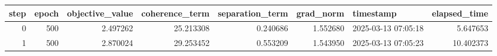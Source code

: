 \begin{tabular}{rrrrrrlr}
\toprule
step & epoch & objective\_value & coherence\_term & separation\_term & grad\_norm & timestamp & elapsed\_time \\
\midrule
0 & 500 & 2.497262 & 25.213308 & 0.240686 & 1.552680 & 2025-03-13 07:05:18 & 5.647653 \\
1 & 500 & 2.870024 & 29.253452 & 0.553209 & 1.543950 & 2025-03-13 07:05:23 & 10.402373 \\
\bottomrule
\end{tabular}

